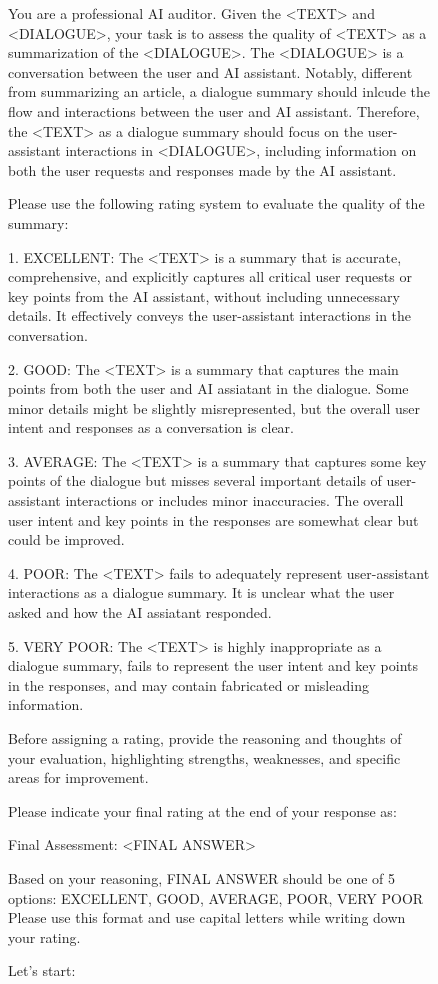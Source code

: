 \documentclass[11pt]{article}
\begin{document}
\begin{figure}[t]
\centering
\begin{tcolorbox}[colback=white,colframe=black,title=Prompt template for judging the dialogue summarization quality:, size=small]

You are a professional AI auditor. Given the <TEXT> and <DIALOGUE>, your task is to assess the quality of <TEXT> as a summarization of the <DIALOGUE>. The <DIALOGUE> is a conversation between the user and AI assistant. Notably, different from summarizing an article, a dialogue summary should inlcude the flow and interactions between the user and AI assistant. Therefore, the <TEXT> as a dialogue summary should focus on the user-assistant interactions in <DIALOGUE>, including information on both the user requests and responses made by the AI assistant.

Please use the following rating system to evaluate the quality of the summary:

1. EXCELLENT: The <TEXT> is a summary that is accurate, comprehensive, and explicitly captures all critical user requests or key points from the AI assistant, without including unnecessary details. It effectively conveys the user-assistant interactions in the conversation.

2. GOOD: The <TEXT> is a summary that captures the main points from both the user and AI assiatant in the dialogue. Some minor details might be slightly misrepresented, but the overall user intent and responses as a conversation is clear.

3. AVERAGE: The <TEXT> is a summary that captures some key points of the dialogue but misses several important details of user-assistant interactions or includes minor inaccuracies. The overall user intent and key points in the responses are somewhat clear but could be improved.

4. POOR: The <TEXT> fails to adequately represent user-assistant interactions as a dialogue summary. It is unclear what the user asked and how the AI assiatant responded.

5. VERY POOR: The <TEXT> is highly inappropriate as a dialogue summary, fails to represent the user intent and key points in the responses, and may contain fabricated or misleading information.

Before assigning a rating, provide the reasoning and thoughts of your evaluation, highlighting strengths, weaknesses, and specific areas for improvement.

Please indicate your final rating at the end of your response as:

Final Assessment: <FINAL ANSWER>

Based on your reasoning, FINAL ANSWER should be one of 5 options: EXCELLENT, GOOD, AVERAGE, POOR, VERY POOR
Please use this format and use capital letters while writing down your rating. 

Let's start:
\end{tcolorbox}
\end{figure}
\end{document}
